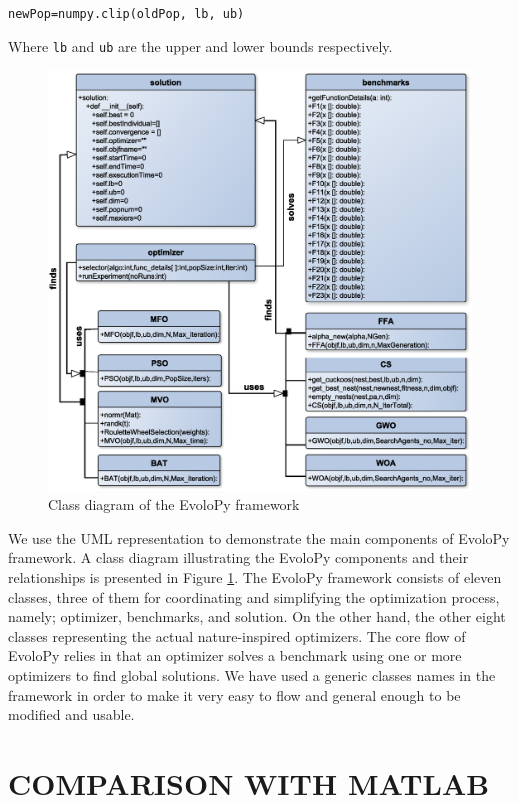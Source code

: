 \documentclass[a4paper,twoside]{article}
\begin{document}
\texttt{newPop=numpy.clip(oldPop, lb, ub)}

Where \texttt{lb} and \texttt{ub} are the upper and lower bounds respectively.

\begin{figure}
\centerline{\includegraphics[scale=0.33]{classD.eps}}
\caption{Class diagram of the EvoloPy framework}
\label{fig:framework}
\end{figure}

We use the UML representation to demonstrate the main components of EvoloPy framework. A class diagram illustrating the EvoloPy components and their relationships is presented in Figure \ref{fig:framework}. The EvoloPy framework consists of eleven classes, three of them for coordinating and simplifying the optimization process, namely; optimizer, benchmarks, and solution. On the other hand, the other eight classes representing the actual nature-inspired optimizers. The core flow of EvoloPy relies in that an optimizer solves a benchmark using one or more optimizers to find global solutions. We have used a generic classes names in the framework in order to make it very easy to flow and general enough to be modified and usable.





\section{\uppercase{Comparison with Matlab}}
\end{document}
